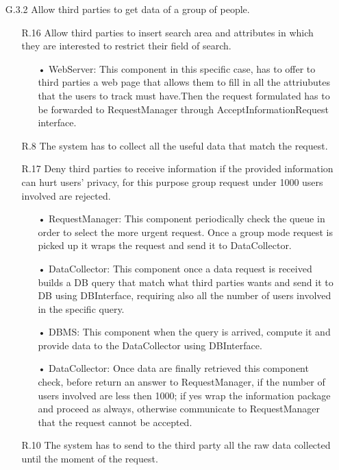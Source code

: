 \begin{enumerate}
\item [G.3.2] Allow third parties to get data of a group of people.
	\begin{enumerate}
	\item [R.16] Allow third parties to insert search area and attributes in which they are interested to restrict their field of search.
		\begin{enumerate}
		\item[•] WebServer: This component in this specific case, has to offer to third parties a web page that allows them to fill in all the attriubutes that the users to track must have.Then the request formulated has to be forwarded to RequestManager through AcceptInformationRequest interface.
		\end{enumerate}	
		
	\item [R.8] The system has to collect all the useful data that match the request.
	\item [R.17] Deny third parties to receive information if the provided information can hurt users' privacy, for this purpose group request under 1000 users involved are rejected.
		\begin{enumerate}
		\item[•] RequestManager: This component periodically check the queue in order to select the more urgent request. Once a group mode request is picked up it wraps the request and send it to DataCollector.
		\item[•] DataCollector: This component once a data request is received builds a DB query that match what third parties wants and send it to DB using DBInterface, requiring also all the number of users involved in the specific query.
		\item[•] DBMS: This component when the query is arrived, compute it and provide data to the DataCollector using DBInterface.
		\item[•] DataCollector: Once data are finally retrieved this component check, before return an answer to RequestManager, if the number of users involved are less then 1000; if yes wrap the information package and proceed as always, otherwise communicate to RequestManager that the request cannot be accepted.
		\end{enumerate}	
		
	\item [R.10] The system has to send to the third party all the raw data collected until the moment of the request.
	\end{enumerate}
	

\end{enumerate}
